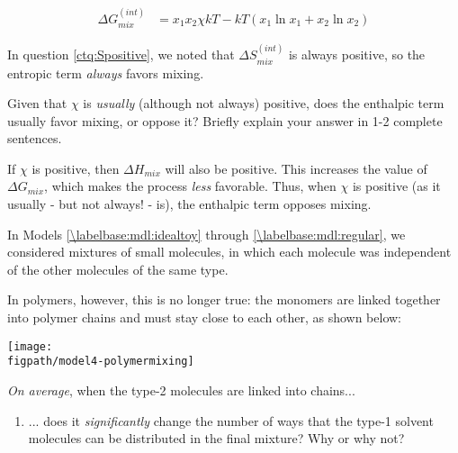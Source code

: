 \begin{activity}
\begin{ctqs}
\begin{enumerate}
			\begin{solution}[1in]
				\begin{align*}
					\Delta G_{mix}^{(int)} &= x_1 x_2 \chi kT - kT(x_1 \ln x_1 + x_2 \ln x_2)
				\end{align*}
			\end{solution}
		\end{enumerate}
			
		\question In question \ref{ctq:Spositive}, we noted that $\Delta S_{mix}^{(int)}$ is always positive, so the entropic term \emph{always} favors mixing.
		
			Given that $\chi$ is \emph{usually} (although not always) positive, does the enthalpic term usually favor mixing, or oppose it?  Briefly explain your answer in 1-2 complete sentences.
			
			\begin{solution}[2in]
			
				If $\chi$ is positive, then $\Delta H_{mix}$ will also be positive.  This increases the value of $\Delta G_{mix}$, which makes the process \emph{less} favorable.    Thus, when $\chi$ is positive (as it usually - but not always! - is), the enthalpic term opposes mixing.
				
			\end{solution}
\end{ctqs}

\begin{model}
\label{\labelbase:mdl:floryhuggins}

In Models \ref{\labelbase:mdl:idealtoy} through \ref{\labelbase:mdl:regular}, we considered mixtures of small molecules, in which each molecule  was independent of the other molecules of the same type.

In polymers, however, this is no longer true: the monomers are linked together into polymer chains and must stay close to each other, as shown below: 
	
	\centerline{\texttt{[image: \\figpath/model4-polymermixing]}}

\end{model}

\begin{ctqs}

	\question \emph{On average}, when the type-2 molecules are linked into chains...
	
		\begin{enumerate}
			\item ... does it \emph{significantly} change the number of ways that the type-1 solvent molecules can be distributed in the final mixture?  Why or why not?
				\label{\labelbase:ctq:FHtype1}
			

\end{enumerate}
\end{ctqs}
\end{activity}
